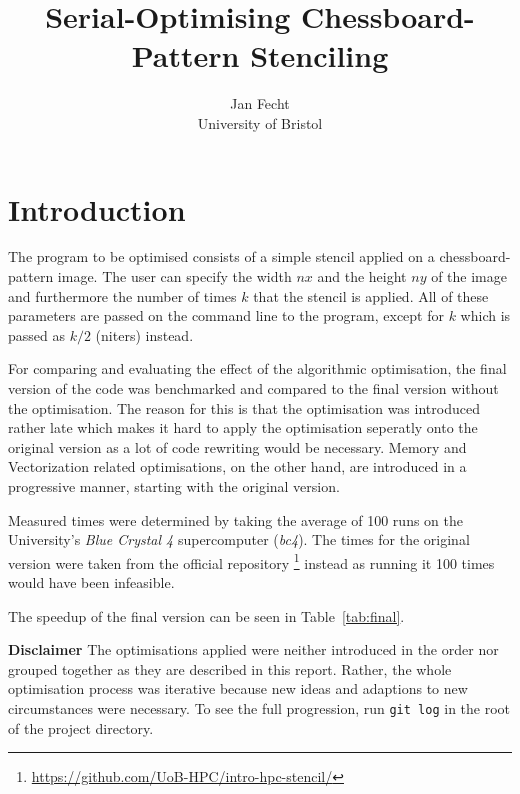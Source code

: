 \documentclass[letterpaper,twocolumn,10pt]{article}
\begin{document}

\date{} %

\title{Serial-Optimising Chessboard-Pattern Stenciling}

\author{
  {\rm Jan Fecht}\\
  University of Bristol}

\maketitle


\section*{Introduction}
The program to be optimised consists of a simple stencil applied on a chessboard-pattern image.
The user can specify the width $nx$ and the height $ny$ of the image and furthermore
the number of times $k$ that the stencil is applied. All of these parameters are passed on the command line to the program, except for $k$ which is passed as $k/2$ (niters) instead.

For comparing and evaluating the effect of
the algorithmic optimisation, the final version of the code was benchmarked
and compared to the final version without the optimisation. The reason for this is
that the optimisation was introduced rather late which makes it hard
to apply the optimisation seperatly onto the original version as a lot of code rewriting
would be necessary.
Memory and Vectorization related optimisations, on the other hand, are introduced in a
progressive manner, starting with the original version.

Measured times were determined by taking the average of 100 runs
on the University's \textit{Blue Crystal 4} supercomputer (\textit{bc4}). The times for
the original version were taken from the official repository
\footnote{\url{https://github.com/UoB-HPC/intro-hpc-stencil/}} instead as running it 100 times would have been infeasible.

The speedup of the final version can be seen in Table~\ref{tab:final}.

\vspace{0.10in}

\textbf{Disclaimer} The optimisations applied were neither introduced
in the order nor grouped together as they are described in this report. Rather, the 
whole optimisation process was iterative because new ideas and adaptions to new
circumstances were necessary. To see the full progression, run \texttt{git log} in the root
of the project directory.
\end{document}
